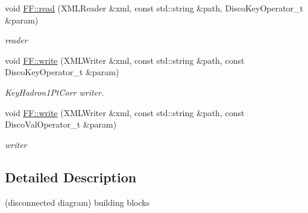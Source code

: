 \begin{DoxyCompactItemize}
void \mbox{\hyperlink{namespaceFF_a4e59e8e764d20bb787e2992c247ca80f}{F\+F\+::read}} (X\+M\+L\+Reader \&xml, const std\+::string \&path, Disco\+Key\+Operator\+\_\+t \&param)
\begin{DoxyCompactList}\small\item\em reader \end{DoxyCompactList}\item 
void \mbox{\hyperlink{namespaceFF_a831b58b450a964b114e0fce65fc4de99}{F\+F\+::write}} (X\+M\+L\+Writer \&xml, const std\+::string \&path, const Disco\+Key\+Operator\+\_\+t \&param)
\begin{DoxyCompactList}\small\item\em Key\+Hadron1\+Pt\+Corr writer. \end{DoxyCompactList}\item 
void \mbox{\hyperlink{namespaceFF_a941e3f6fd9d8acd3d0c6b1f03c4be71b}{F\+F\+::write}} (X\+M\+L\+Writer \&xml, const std\+::string \&path, const Disco\+Val\+Operator\+\_\+t \&param)
\begin{DoxyCompactList}\small\item\em writer \end{DoxyCompactList}\end{DoxyCompactItemize}


\subsection{Detailed Description}
(disconnected diagram) building blocks 

